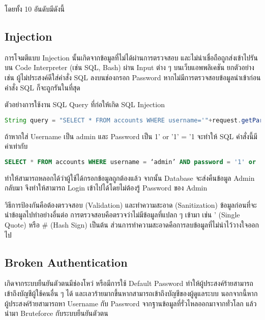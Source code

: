 โดยทั้ง 10 อันดับมีดังนี้

\subsection{Injection}

การโจมตีแบบ Injection นั้นเกิดจากข้อมูลที่ไม่ได้ผ่านการตรวจสอบ และไม่น่าเชื่อถือถูกส่งเข้าไปรันบน Code Interpreter (เช่น SQL, Bash) ผ่าน Input ต่าง ๆ บนเว็บแอพพลิเคชัน ยกตัวอย่างเช่น ผู้ไม่ประสงค์ดีใส่คำสั่ง SQL ลงบนช่องกรอก Password หากไม่มีการตรวจสอบข้อมูลนำเข้าก่อน คำสั่ง SQL ก็จะถูกรันในที่สุด

ตัวอย่างการใช้งาน SQL Query ที่ก่อให้เกิด SQL Injection

\begin{lstlisting}[language=Java, numbers=none] 
String query = "SELECT * FROM accounts WHERE username='"+request.getParameter("username") + "'" + "AND password ='" + request.getParameter("password") + "'";
\end{lstlisting}

ถ้าหากใส่ Username เป็น admin และ Password เป็น 1' or '1' = '1 จะทำให้ SQL คำสั่งนี้มีค่าเท่ากับ

\begin{lstlisting}[language=SQL, numbers=none] 
SELECT * FROM accounts WHERE username = ‘admin’ AND password = '1' or '1' = '1'
\end{lstlisting}

ทำให้สามารถหลอกได้ว่าผู้ใช้ได้กรอกข้อมูลถูกต้องแล้ว จากนั้น Database จะส่งคืนข้อมูล Admin กลับมา จึงทำให้สามารถ Login เข้าไปได้โดยไม่ต้องรู้ Password ของ Admin

วิธีการป้องกันคือต้องตรวจสอบ (Validation) และทำความสะอาด (Sanitization) ข้อมูลก่อนที่จะนำข้อมูลไปทำอย่างอื่นต่อ การตรวจสอบคือตรวจว่าไม่มีข้อมูลที่แปลก ๆ เข้ามา เช่น ' (Single Quote) หรือ \# (Hash Sign) เป็นต้น ส่วนการทำความสะอาดคือการลบข้อมูลที่ไม่น่าไว้วางใจออกไป

\subsection{Broken Authentication}
เกิดจากระบบยืนยันตัวตนมีช่องโหว่ หรือมีการใช้ Default Password ทำให้ผู้ประสงค์ร้ายสามารถเข้าถึงบัญชีผู้ใช้คนอื่น ๆ ได้ และเลวร้ายมากขึ้นหากสามารถเข้าถึงบัญชีของผู้ดูแลระบบ นอกจากนี้หากผู้ประสงค์ร้ายสามารถหา Username กับ Password จากฐานข้อมูลที่รั่วไหลออกมาจากทั่วโลก \cite{???} แล้วนำมา Bruteforce กับระบบยืนยันตัวตน

